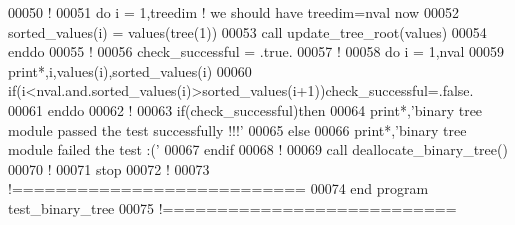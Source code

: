 \begin{DoxyCode}
00050   \textcolor{comment}{!}
00051   \textcolor{keyword}{do} i = 1,treedim  \textcolor{comment}{! we should have treedim=nval now}
00052      sorted\_values(i) = values(tree(1))
00053      call update\_tree\_root(values)
00054   \textcolor{keyword}{enddo}
00055   \textcolor{comment}{!}
00056   check\_successful = .true.
00057   \textcolor{comment}{!}
00058   \textcolor{keyword}{do} i = 1,nval
00059      print*,i,values(i),sorted\_values(i)
00060      \textcolor{keyword}{if}(i<nval.and.sorted\_values(i)>sorted\_values(i+1))check\_successful=.false.
00061   \textcolor{keyword}{enddo}
00062   \textcolor{comment}{!}
00063   \textcolor{keyword}{if}(check\_successful)\textcolor{keyword}{then}
00064      print*,\textcolor{stringliteral}{'binary tree module passed the test successfully !!!'}
00065   \textcolor{keyword}{else}
00066      print*,\textcolor{stringliteral}{'binary tree module failed the test :('}
00067   \textcolor{keyword}{endif}
00068   \textcolor{comment}{!}
00069   call deallocate\_binary\_tree()
00070   \textcolor{comment}{!}
00071   stop
00072   \textcolor{comment}{!}
00073 \textcolor{comment}{!===========================}
00074 \textcolor{keyword}{end program test\_binary\_tree}
00075 \textcolor{comment}{!===========================}
\end{DoxyCode}
